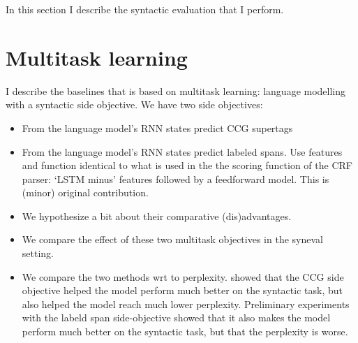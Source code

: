 

In this section I describe the syntactic evaluation that I perform.


\section{Multitask learning}
I describe the baselines that is based on multitask learning: language modelling with a syntactic side objective. We have two side objectives:
\begin{itemize}
  \item From the language model's RNN states predict CCG supertags  \citep{Enguehard+2017:RNN-multitask}
  \item From the language model's RNN states predict labeled spans. Use features and function identical to what is used in the the scoring function of the CRF parser: `LSTM minus' features followed by a feedforward model. This is (minor) original contribution.
  \item We hypothesize a bit about their comparative (dis)advantages.
  \item We compare the effect of these two multitask objectives in the syneval setting.
  \item We compare the two methods wrt to perplexity. \cite{Enguehard+2017:RNN-multitask} showed that the CCG side objective helped the model perform much better on the syntactic task, but also helped the model reach much lower perplexity. Preliminary experiments with the labeld span side-objective showed that it also makes the model perform much better on the syntactic task, but that the perplexity is worse.
\end{itemize}

